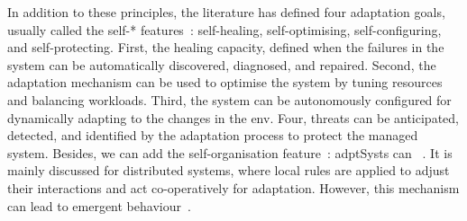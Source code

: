 In addition to these principles, the literature has defined four adaptation goals, usually called the self-* features~\cite{computing2006architectural}: self-healing, self-optimising, self-configuring, and self-protecting.
First, the healing capacity, defined when the failures in the system can be automatically discovered, diagnosed, and repaired.
Second, the adaptation mechanism can be used to optimise the system by tuning resources and balancing workloads.
Third, the system can be autonomously configured for dynamically adapting to the changes in the \gls{env}.
Four, threats can be anticipated, detected, and identified by the adaptation process to protect the managed system.
Besides, we can add the self-organisation feature~\cite{dempster1998self}: \glspl{adptSyst} can ~\cite{DBLP:conf/atal/WolfH04}.
It is mainly discussed for distributed systems, where local rules are applied to adjust their interactions and act co-operatively for adaptation.
However, this mechanism can lead to emergent behaviour~\cite{DBLP:conf/atal/WolfH04}.

